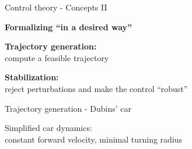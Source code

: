 \documentclass[usenames,dvipsnames,xcolor=table]{beamer}
\begin{document}
\begin{frame}{Control theory - Concepts II}
\begin{center}
\textbf{\Large Formalizing ``in a desired way''}\\[12pt]
\begin{minipage}{\linewidth}
\begin{minipage}[t]{0.49\linewidth}
	\begin{center}
	\textbf{\large Trajectory generation: }\\[4pt]
	compute a feasible trajectory
	\end{center}	
	\vfill
\end{minipage}
\hfill
\begin{minipage}[t]{0.49\linewidth}
	\begin{center}
	\textbf{\large Stabilization: }\\[4pt]
	reject perturbations and make the control ``robust''
	\end{center}
	\vfill
\end{minipage}
\end{minipage}
\end{center}
\end{frame}
\begin{frame}{Trajectory generation - Dubins' car}
\begin{center}
Simplified car dynamics:\\
constant forward velocity, minimal turning radius

\end{center}
\end{frame}
\end{document}
